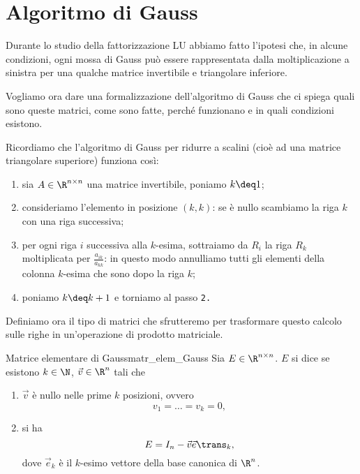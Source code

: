 \section{Algoritmo di Gauss}

Durante lo studio della fattorizzazione LU abbiamo fatto l'ipotesi che, in alcune condizioni, ogni mossa di Gauss può essere rappresentata dalla moltiplicazione a sinistra per una qualche matrice invertibile e triangolare inferiore.

Vogliamo ora dare una formalizzazione dell'algoritmo di Gauss che ci spiega quali sono queste matrici, come sono fatte, perché funzionano e in quali condizioni esistono.

Ricordiamo che l'algoritmo di Gauss per ridurre a scalini (cioè ad una matrice triangolare superiore) funziona così:
\begin{enumerate}[1.]
    \item sia $A \in \Mat{\R, n, n}$ una matrice invertibile, poniamo $k \deq 1$; 
    \item consideriamo l'elemento in posizione $(k, k)$: se è nullo scambiamo la riga $k$ con una riga successiva;
    \item per ogni riga $i$ successiva alla $k$-esima, sottraiamo da $R_i$ la riga $R_k$ moltiplicata per $\frac{a_{ik}}{a_{kk}}$: in questo modo annulliamo tutti gli elementi della colonna $k$-esima che sono dopo la riga $k$;
    \item poniamo $k \deq k+1$ e torniamo al passo \texttt{2.} 
\end{enumerate}

Definiamo ora il tipo di matrici che sfrutteremo per trasformare questo calcolo sulle righe in un'operazione di prodotto matriciale.

\begin{definition}
    {Matrice elementare di Gauss}{matr_elem_Gauss}
    Sia $E \in \Mat{\R, n, n}$. $E$ si dice  se esistono $k \in \N$, $\vec v \in \R^n$ tali che 
    \begin{enumerate}
        \item $\vec v$ è nullo nelle prime $k$ posizioni, ovvero \[
            v_1 = \dots = v_k = 0,
        \]
        \item si ha \[
            E = I_n - \vec v\vec{e}\trans_k,
        \] dove $\vec{e}_k$ è il $k$-esimo vettore della base canonica di $\R^n$. 
    \end{enumerate}  
\end{definition}

